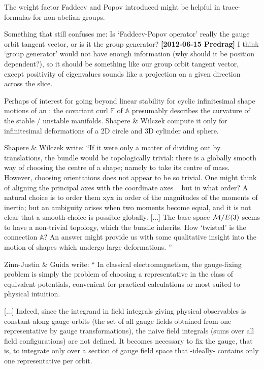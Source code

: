 \begin{description}
The weight factor Faddeev and Popov introduced might be helpful in
trace-formulas for non-abelian groups.

Something that still confuses me: Is `Faddeev-Popov operator' really the
gauge orbit tangent vector, or is it the group generator? {\bf
[2012-06-15 Predrag]} I think `group generator' would not have enough
information (why should it be position dependent?), so it should be
something like our group orbit tangent vector, except positivity of
eigenvalues sounds like a projection on a given direction across the
slice.


\item[2013-12-03 Predrag]
Perhaps of interest for going beyond linear stability for cyclic
infinitesimal shape motions of an \eqv: the covariant curl $\mathbb{F}$
of $\mathbb{A}$ presumably describes the curvature of the stable /
unstable manifolds. Shapere \& Wilczek compute it only for
infinitesimal deformations of a 2D circle and 3D cylinder and sphere.

\item[2013-12-03 Predrag] Shapere \& Wilczek write:
``If it were only a matter of dividing out by translations, the bundle
would be topologically trivial: there is a globally smooth way of
choosing the centre of a shape; namely to take its centre of mass.
However, choosing orientations does not appear to be so trivial. One
might think of aligning the principal axes with the coordinate axes ~ but
in what order? A natural choice is to order them xyx in order of the
magnitudes of the moments of inertia; but an ambiguity arises when two
moments become equal, and it is not clear that a smooth choice is
possible globally.
[...]
The base space $\mathcal{M}/E(3)$ seems to have a non-trivial topology, which the
bundle inherits. How `twisted' is the connection $\mathbb{A}$? An answer
might provide us with some qualitative insight into the motion of shapes
which undergo large deformations.
''

\item[2013-12-05 Predrag]
Zinn-Justin \& Guida write: ``
In classical electromagnetism, the gauge-fixing problem is simply the problem of choosing a representative in the class of equivalent potentials, convenient for practical calculations or most suited to physical intuition.

[...] Indeed, since the integrand in field integrals giving physical observables is constant along gauge orbits (the set of all gauge fields obtained from one representative by gauge transformations), the naive field integrals (sums over all field configurations) are not defined. It becomes necessary to fix the gauge, that is, to integrate only over a section of gauge field space that -ideally- contains only one representative per orbit.


\end{description}
